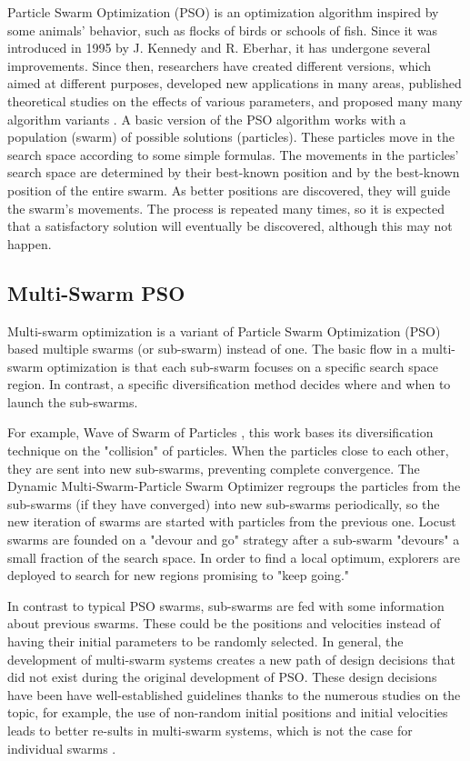 \documentclass[runningheads]{llncs}
\begin{document}
Particle Swarm Optimization (PSO) is an optimization algorithm inspired by some animals' behavior, such as flocks of birds or schools of fish. Since it was introduced in 1995 by  J. Kennedy and R. Eberhar, it has undergone several improvements.\cite{b1} %
Since then, researchers have created different versions, which aimed at different
purposes, developed new applications in many areas, published theoretical
studies on the effects of various parameters, and proposed many many algorithm variants \cite{b2}. A basic version of the PSO algorithm works with a population (swarm) of possible solutions (particles). These particles move in the search space according to some simple formulas. The movements in the particles' search space are determined by their best-known position and by the best-known position of the entire swarm. As better positions are discovered, they will guide the swarm's movements. The process is repeated many times, so it is expected that a satisfactory solution will eventually be discovered, although this may not happen\cite{b3}.

\subsection{Multi-Swarm PSO}

Multi-swarm optimization is a variant of Particle Swarm Optimization (PSO) based  multiple swarms (or sub-swarm) instead of one. The basic flow in a multi-swarm optimization is that each sub-swarm focuses on a specific search space region. In contrast, a specific diversification method decides where and when to launch the sub-swarms. 

For example, Wave of Swarm of Particles \cite{b6}, this work bases its diversification technique on the "collision" of particles. When the particles close to each other, they are sent into new sub-swarms, preventing complete convergence. The Dynamic Multi-Swarm-Particle Swarm Optimizer\cite{b7} regroups the particles from the sub-swarms (if they have converged) into new sub-swarms periodically, so the new iteration of swarms are started with particles from the previous one. Locust swarms \cite{b8} are founded on a "devour and go" strategy after a sub-swarm "devours" a small fraction of the search space. In order to find a local optimum, explorers are deployed to search for new regions promising to "keep going."

In contrast to typical PSO swarms, sub-swarms are fed with some information about previous swarms. These could be the positions and velocities instead of having their initial parameters to be randomly selected. In general, the development of multi-swarm systems creates a new path of design decisions that did not exist during the original development of PSO. These design decisions have been have well-established guidelines thanks to the numerous studies on the topic, for example, the use of non-random initial positions and initial velocities leads to better re-sults in multi-swarm systems, which is not the case for individual swarms \cite{b9}.
\end{document}
